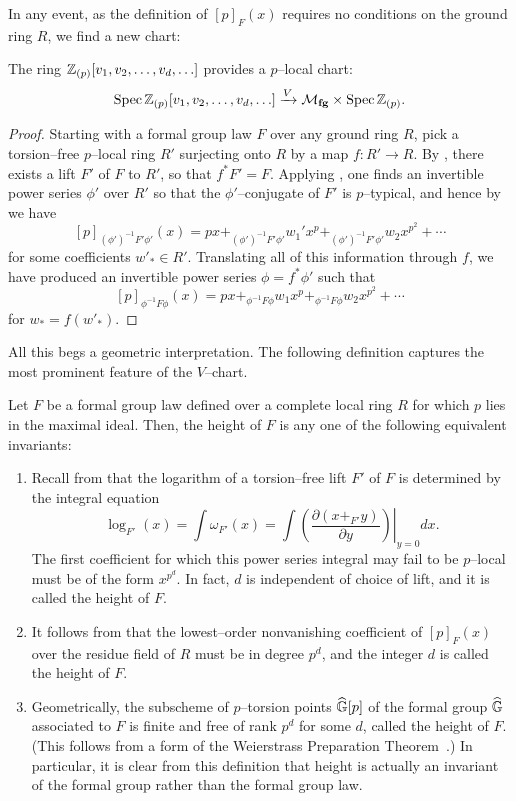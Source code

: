 In any event, as the definition of $[p]_F(x)$ requires no conditions on the ground ring $R$, we find a new chart:
\begin{theorem}\label{VChart}
The ring $\mathbb Z_{(p)}[v_1, v_2, \ldots, v_d, \ldots]$ provides a $p$--local chart: \[\operatorname{Spec} \mathbb Z_{(p)}[v_1, v_2, \ldots, v_d, \ldots] \xrightarrow{V} \mathcal{M}_{\mathbf{fg}} \times \operatorname{Spec} \mathbb Z_{(p)}.\]
\end{theorem}
\begin{proof}
Starting with a formal group law $F$ over any ground ring $R$, pick a torsion--free $p$--local ring $R'$ surjecting onto $R$ by a map $f: R' \to R$.  By , there exists a lift $F'$ of $F$ to $R'$, so that $f^* F' = F$.  Applying , one finds an invertible power series $\phi'$ over $R'$ so that the $\phi'$--conjugate of $F'$ is $p$--typical, and hence by  we have \[[p]_{(\phi')^{-1} F' \phi'}(x) = px +_{(\phi')^{-1} F' \phi'} w_1' x^p +_{(\phi')^{-1} F' \phi'} w_2 x^{p^2} + \cdots\] for some coefficients $w'_* \in R'$.  Translating all of this information through $f$, we have produced an invertible power series $\phi = f^* \phi'$ such that \[[p]_{\phi^{-1} F \phi}(x) = px +_{\phi^{-1} F \phi} w_1 x^p +_{\phi^{-1} F \phi} w_2 x^{p^2} + \cdots\] for $w_* = f(w'_*)$.
\end{proof}

All this begs a geometric interpretation.  The following definition captures the most prominent feature of the $V$--chart.

\begin{definition}\label{DefinitionOfHeight}
Let $F$ be a formal group law defined over a complete local ring $R$ for which $p$ lies in the maximal ideal.  Then, the height of $F$ is any one of the following equivalent invariants:
\begin{enumerate}
\item Recall from  that the logarithm of a torsion--free lift $F'$ of $F$ is determined by the integral equation \[\log_{F'}(x) = \int \omega_{F'}(x) = \int \left. \left( \frac{\partial( x +_{F'} y)}{\partial y}\right) \right|_{y=0} dx.\]  The first coefficient for which this power series integral may fail to be $p$--local must be of the form $x^{p^d}$.  In fact, $d$ is independent of choice of lift, and it is called the height of $F$.
\item It follows from  that the lowest--order nonvanishing coefficient of $[p]_F(x)$ over the residue field of $R$ must be in degree $p^d$, and the integer $d$ is called the height of $F$.
\item Geometrically, the subscheme of $p$--torsion points $\widehat{\mathbb G}[p]$ of the formal group $\widehat{\mathbb G}$ associated to $F$ is finite and free of rank $p^d$ for some $d$, called the height of $F$.  (This follows from a form of the Weierstrass Preparation Theorem~\cite[Lemma 5.14]{StricklandFSFG}.)  In particular, it is clear from this definition that height is actually an invariant of the formal group rather than the formal group law.
\end{enumerate}
\end{definition}

